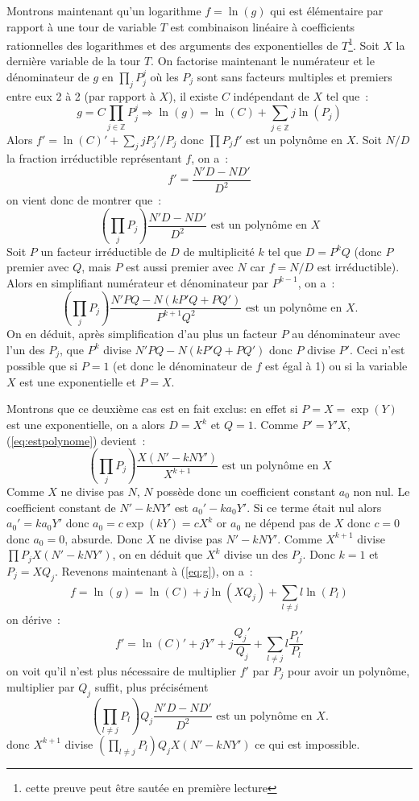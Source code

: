 \documentclass[a4paper,11pt]{article}
\newcommand{\Z}{{\mathbb{Z}}}
\begin{document}
\begin{giacjshere}
Montrons maintenant qu'un logarithme $f=\ln(g)$ qui est élémentaire
par rapport à une tour de variable $T$ est combinaison linéaire à
coefficients rationnelles des logarithmes et des arguments
des exponentielles de $T$\footnote{cette preuve peut être sautée en première
lecture}.
Soit $X$ la dernière variable de la tour $T$.
On factorise maintenant le numérateur et le dénominateur de $g$ en
$\prod_j P_j^j$ où les $P_j$ sont sans facteurs multiples et 
premiers entre eux 2 à 2 (par rapport à $X$), il existe
$C$ indépendant de $X$ tel que~:
\begin{equation} \label{eq:g}
 g=C\prod_{j \in \Z} P_j ^{j} \Rightarrow 
\ln(g)=\ln(C)+\sum_{j \in \Z} j \ln(P_j)
\end{equation}
Alors $f'=\ln(C)'+\sum_j j P_j'/P_j$ donc $\prod P_j f'$ est un 
polynôme en $X$. 
Soit $N/D$ la fraction irréductible représentant $f$, on a~:
\[ f'=\frac{N' D -N D'}{D^2}\]
on vient donc de montrer que~:
\begin{equation} \label{eq:prodpj}
\left(\prod_j P_j \right) \frac{N' D - N D'}{D^2} 
\mbox{ est un polynôme en $X$}
\end{equation}
Soit $P$ un facteur irréductible de $D$ de multiplicité
$k$ tel que $D=P^k Q$ (donc $P$ premier avec $Q$, mais $P$ est aussi
premier avec $N$ car $f=N/D$ est irréductible). Alors en simplifiant
numérateur et dénominateur par $P^{k-1}$, on a~:
\begin{equation} \label{eq:estpolynome}
 \left( \prod_j P_j \right) \frac{N' P Q - N (kP'Q+PQ')}{ P^{k+1} Q^2} 
\mbox{ est un polynôme en $X$.} 
\end{equation}
On en déduit, après simplification d'au plus un facteur $P$ au dénominateur 
avec l'un des $P_j$, que $P^{k}$ divise 
$N' P Q - N (kP'Q+PQ')$ donc $P$ divise $P'$. Ceci n'est possible
que si $P=1$ (et donc le dénominateur de $f$ est égal à 1) 
ou si la variable $X$ est une exponentielle et $P=X$.

Montrons que ce deuxième cas est en fait exclus:
en effet si $P=X=\exp(Y)$ est une exponentielle, on a alors 
$D=X^k$ et $Q=1$.
Comme $P'=Y'X$, (\ref{eq:estpolynome}) devient~:
\[ \left( \prod_j P_j \right) \frac{X (N' - k N Y' )}{X^{k+1}}
\mbox{ est un polynôme en $X$} \]
Comme $X$ ne divise pas $N$, $N$ possède donc un coefficient constant 
$a_0$ non nul. Le coefficient constant de $N'-kNY'$ est $a_0'-ka_0 Y'$. 
Si ce terme était nul alors $a_0'=ka_0 Y'$ donc $a_0=c \exp(kY)=cX^k$ 
or $a_0$ ne dépend pas de $X$ donc $c=0$ donc $a_0=0$, absurde. 
Donc $X$ ne divise pas $N'-kNY'$.
Comme $X^{k+1}$ divise $ \prod P_j X (N' - k N Y' )$, on en déduit que
$X^k$ divise un des $P_j$. Donc $k=1$ et $P_j=XQ_j$. 
Revenons maintenant à (\ref{eq:g}), on a~:
\[  f=\ln(g) = \ln(C)+j \ln(XQ_j)+ \sum_{l \neq j} l \ln(P_l) \]
on dérive~:
\[ f'=\ln(C)'+jY'+j\frac{Q_j'}{Q_j}+\sum_{l \neq j} l \frac{P_l'}{P_l}\]
on voit qu'il n'est plus nécessaire de multiplier $f'$ par $P_j$
pour avoir un polynôme, multiplier par $Q_j$ suffit, plus précisément
\[ 
\left( \prod_{l \neq j} P_l \right) Q_j \frac{N' D - N D'}{D^2} 
\mbox{ est un polynôme en $X$.} 
\]
donc $X^{k+1}$ divise  
$ \left(\prod_{l \neq j}P_l \right) Q_j X (N' - k N Y' )$ 
ce qui est impossible.


\end{giacjshere}
\end{document}
